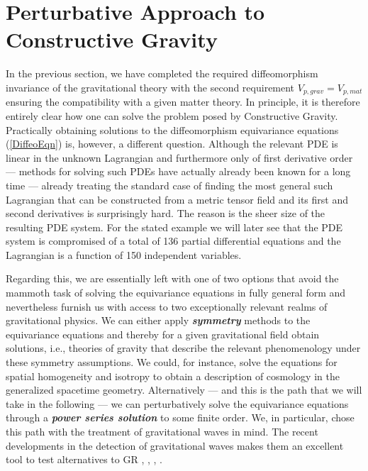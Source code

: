 \documentclass[a4paper,12pt, DIV=14, BCOR=5mm, twoside, headsepline, numbers=noenddot]{scrbook}
\begin{document}
\section{Perturbative Approach to Constructive Gravity}
In the previous section, we have completed the required diffeomorphism invariance of the gravitational theory with the second requirement $V_{p,grav}=V_{p,mat}$ ensuring the compatibility with a given matter theory. In principle, it is therefore entirely clear how one can solve the problem posed by Constructive Gravity. Practically obtaining solutions to the diffeomorphism equivariance equations (\ref{DiffeoEqn}) is, however, a different question. Although the relevant PDE is linear in the unknown Lagrangian and furthermore only of first derivative order --- methods for solving  such PDEs have actually already been known for a long time \cite{Han2015} --- already treating the standard case of finding the most general such Lagrangian that can be constructed from a metric tensor field and its first and second derivatives is surprisingly hard. The reason is the sheer size of the resulting PDE system. For the stated example we will later see that the PDE system is compromised of a total of 136 partial differential equations and the Lagrangian is a function of 150 independent variables.  

Regarding this, we are essentially left with one of two options that avoid the mammoth task of solving the equivariance equations in fully general form and nevertheless furnish us with access to two exceptionally relevant realms of gravitational physics. We can either apply \textbf{\textit{symmetry}} methods to the equivariance equations and thereby for a given gravitational field obtain solutions, i.e., theories of gravity that describe the relevant phenomenology under these symmetry assumptions. We could, for instance, solve the equations for spatial homogeneity and isotropy to obtain a description of cosmology in the generalized spacetime geometry. Alternatively --- and this is the path that we will take in the following --- we can perturbatively solve the equivariance equations through a \textit{\textbf{power series solution}} to some finite order. We, in particular, chose this path with the treatment of gravitational waves in mind.  The recent developments in the detection of gravitational waves makes them an excellent tool to test alternatives to GR \cite{2010PhRvD..81f4008Y}, \cite{2011PhRvD..83j4022B}, \cite{2017PhRvD..95j4027Z}, \cite{2013LRR....16....9Y}.
\end{document}
